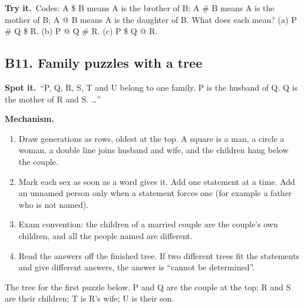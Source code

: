 \documentclass[11pt,a4paper]{article}
\let\oldsubsection\subsection
\renewcommand{\subsection}{\needspace{9\baselineskip}\oldsubsection}
\newcommand{\spot}{\textbf{\color{ember}Spot it.}\ }
\newcommand{\mech}{\textbf{\color{ember}Mechanism.}\ }
\newcommand{\tryit}[1]{\textbf{\color{ember}Try it.}\ #1}
\begin{document}
\tryit Codes: A \$ B means A is the brother of B; A \# B means A is the mother of B; A @ B means A is the daughter of B. What does each mean? (a) P \# Q \$ R. (b) P @ Q \# R. (c) P \$ Q @ R.

\subsection{B11. Family puzzles with a tree}
\spot ``P, Q, R, S, T and U belong to one family. P is the husband of Q. Q is the mother of R and S. \dots''

\mech
\begin{enumerate}
\item Draw generations as rows, oldest at the top. A square is a man, a circle a woman, a double line joins husband and wife, and the children hang below the couple.
\item Mark each sex as soon as a word gives it. Add one statement at a time. Add an unnamed person only when a statement forces one (for example a father who is not named).
\item Exam convention: the children of a married couple are the couple's own children, and all the people named are different.
\item Read the answers off the finished tree. If two different trees fit the statements and give different answers, the answer is ``cannot be determined''.
\end{enumerate}

\begin{center}
\par\nopagebreak\smallskip
{\small The tree for the first puzzle below. P and Q are the couple at the top; R and S are their children; T is R's wife; U is their son.}
\end{center}
\end{document}
